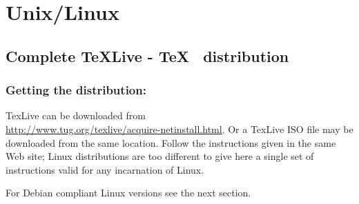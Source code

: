 \section*{Unix/Linux}
\subsection*{Complete TeXLive - \TeX~ distribution}
\subsubsection*{Getting the distribution:}
TexLive can be downloaded from\\
  \href{http://www.tug.org/texlive/acquire-netinstall.html}
  {http://www.tug.org/texlive/acquire-netinstall.html}. 
Or a TexLive ISO file may be downloaded from the same location.
Follow the instructions given in the same Web site; Linux distributions are too different to give here a single  set of instructions valid for any incarnation of Linux. 

For Debian compliant Linux versions see the next section.

